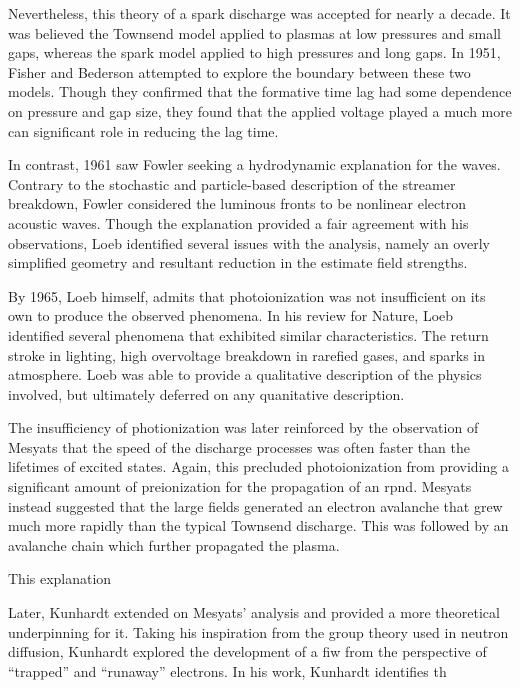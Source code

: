 Nevertheless, this theory of a spark discharge was accepted for nearly a decade.
It was believed the Townsend model applied to plasmas at low pressures and small
gaps, whereas the spark model applied to high pressures and long gaps. In 1951,
Fisher and Bederson attempted to explore the boundary between these two models.
Though they confirmed that the formative time lag had some dependence on
pressure and gap size, they found that the applied voltage played a much more
 can significant role in reducing the lag time.

In contrast, 1961 saw Fowler \cite{Fowler1961} seeking a hydrodynamic
explanation for the waves. Contrary to the stochastic and particle-based
description of the streamer breakdown, Fowler considered the luminous fronts to
be nonlinear electron acoustic waves. Though the explanation provided a fair
agreement with his observations, Loeb \cite{Loeb1965} identified several
issues with the analysis, namely an overly simplified geometry and resultant
reduction in the estimate field strengths.

By 1965, Loeb himself, admits that photoionization was not insufficient on its
own to produce the observed phenomena. In his review for Nature, Loeb
identified several phenomena that exhibited similar characteristics. The
return stroke in lighting, high overvoltage breakdown in rarefied gases, and
sparks in atmosphere. Loeb was able to provide a qualitative description of the
physics involved, but ultimately deferred on any quanitative description.

The insufficiency of photionization was later reinforced by the observation of
Mesyats \cite{Mesyats1972} that the speed of the discharge processes was often
faster than the lifetimes of excited states. Again, this precluded
photoionization from providing a significant amount of preionization for the
propagation of an rpnd. Mesyats instead suggested that the large fields
generated an electron avalanche that grew much more rapidly than the typical
Townsend discharge. This was followed by an avalanche chain which further
propagated the plasma.

This explanation 

Later, Kunhardt \cite{Kunhardt1980} extended on Mesyats' analysis and provided a
more theoretical underpinning for it. Taking his inspiration from the group
theory used in neutron diffusion, Kunhardt explored the development of a fiw
from the perspective of ``trapped'' and ``runaway'' electrons. In his
work, Kunhardt identifies th

